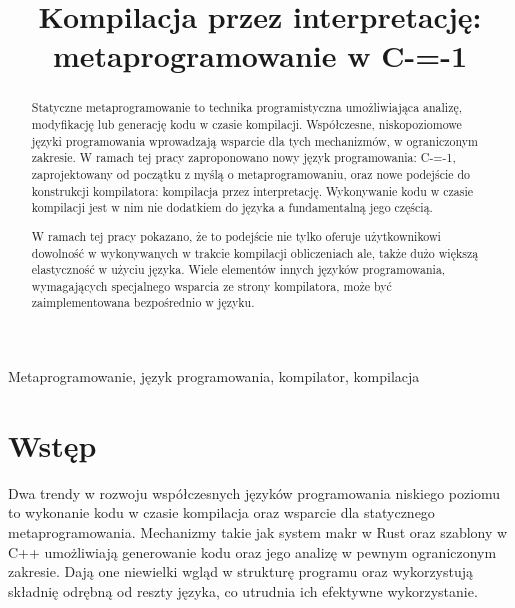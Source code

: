 \documentclass[conference]{IEEEtran}
\begin{document}
\title{Kompilacja przez interpretację: metaprogramowanie w C-=-1
}

\author{
}

\maketitle

\begin{abstract}
Statyczne metaprogramowanie to technika programistyczna umożliwiająca analizę, modyfikację lub generację kodu w czasie kompilacji.
Współczesne, niskopoziomowe języki programowania wprowadzają wsparcie dla tych mechanizmów, w ograniczonym zakresie.
W ramach tej pracy zaproponowano nowy język programowania: C-=-1, zaprojektowany od początku z myślą o metaprogramowaniu, oraz nowe podejście do konstrukcji kompilatora: kompilacja przez interpretację.
Wykonywanie kodu w czasie kompilacji jest w nim nie dodatkiem do języka a fundamentalną jego częścią.

W ramach tej pracy pokazano, że to podejście nie tylko oferuje użytkownikowi dowolność w wykonywanych w trakcie kompilacji obliczeniach ale, także dużo większą elastyczność w użyciu języka.
Wiele elementów innych języków programowania, wymagających specjalnego wsparcia ze strony kompilatora, może być zaimplementowana bezpośrednio w języku.
\end{abstract}

\begin{IEEEkeywords}
    Metaprogramowanie, język programowania, kompilator, kompilacja
\end{IEEEkeywords}

\section{Wstęp}
Dwa trendy w rozwoju współczesnych języków programowania niskiego poziomu to wykonanie kodu w czasie kompilacja oraz wsparcie dla statycznego metaprogramowania.
Mechanizmy takie jak system makr w Rust oraz szablony w C++ umożliwiają generowanie kodu oraz jego analizę w pewnym ograniczonym zakresie.
Dają one niewielki wgląd w strukturę programu oraz wykorzystują składnię odrębną od reszty języka, co utrudnia ich efektywne wykorzystanie.
\end{document}
